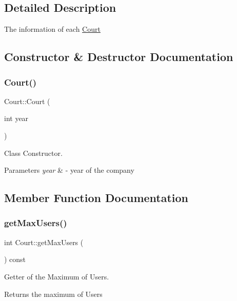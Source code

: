 \subsection{Detailed Description}
The information of each \mbox{\hyperlink{class_court}{Court}} 

\subsection{Constructor \& Destructor Documentation}
\mbox{\label{class_court_a594463e426e762163a09290e48d1d437}} 
\subsubsection{\texorpdfstring{Court()}{Court()}}
{\footnotesize\ttfamily Court\+::\+Court (\begin{DoxyParamCaption}\item[{int}]{year }\end{DoxyParamCaption})}



Class Constructor. 


\begin{DoxyParams}{Parameters}
{\em year} & -\/ year of the company \\
\hline
\end{DoxyParams}


\subsection{Member Function Documentation}
\mbox{\label{class_court_a9992ef2a5d2ee81e8cc7f24f8c917f31}} 
\subsubsection{\texorpdfstring{get\+Max\+Users()}{getMaxUsers()}}
{\footnotesize\ttfamily int Court\+::get\+Max\+Users (\begin{DoxyParamCaption}{ }\end{DoxyParamCaption}) const}



Getter of the Maximum of Users. 

\begin{DoxyReturn}{Returns}
the maximum of Users 
\end{DoxyReturn}
\mbox{\label{class_court_abb67c98e97c13d7eb9e49622a2e12aff}} 
